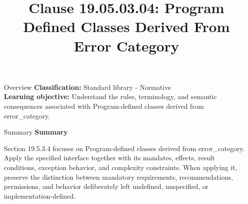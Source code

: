 \documentclass[10pt,letterpaper]{article}
\title{Clause 19.05.03.04: Program Defined Classes Derived From Error Category}
\author{}
\date{}
\begin{document}
\maketitle
\begin{CornellOverviewBox}{Overview}
\textbf{Classification:} Standard library - Normative\\[2pt]
\textbf{Learning objective:} Understand the rules, terminology, and semantic consequences associated with Program-defined classes derived from error\_category.
\end{CornellOverviewBox}\begin{CornellSummaryBox}{Summary}
{\sffamily\bfseries\color{Accent} Summary}\par\vspace{3pt}Section 19.5.3.4 focuses on Program-defined classes derived from error\_category. Apply the specified interface together with its mandates, effects, result conditions, exception behavior, and complexity constraints. When applying it, preserve the distinction between mandatory requirements, recommendations, permissions, and behavior deliberately left undefined, unspecified, or implementation-defined.
\end{CornellSummaryBox}
\end{document}
